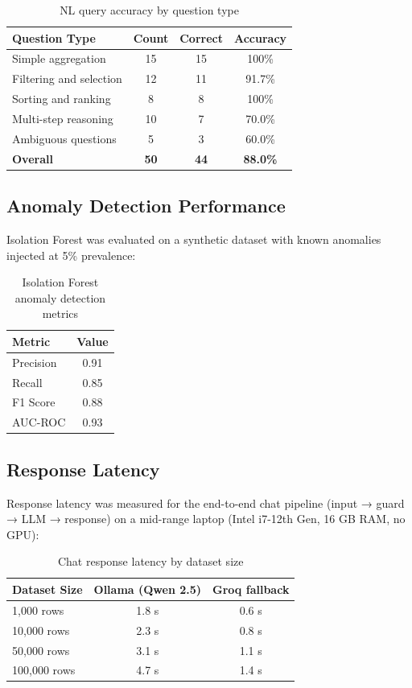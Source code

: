 \documentclass[12pt,a4paper]{report}
\begin{document}
\begin{table}[H]
\centering
\caption{NL query accuracy by question type}
\begin{tabularx}{\textwidth}{Xccc}
\toprule
\textbf{Question Type} & \textbf{Count} & \textbf{Correct} & \textbf{Accuracy} \\
\midrule
Simple aggregation       & 15 & 15 & 100\% \\
Filtering and selection  & 12 & 11 & 91.7\% \\
Sorting and ranking      & 8  & 8  & 100\% \\
Multi-step reasoning     & 10 & 7  & 70.0\% \\
Ambiguous questions      & 5  & 3  & 60.0\% \\
\midrule
\textbf{Overall}         & \textbf{50} & \textbf{44} & \textbf{88.0\%} \\
\bottomrule
\end{tabularx}
\end{table}

\subsection{Anomaly Detection Performance}

Isolation Forest was evaluated on a synthetic dataset with known anomalies injected at 5\% prevalence:

\begin{table}[H]
\centering
\caption{Isolation Forest anomaly detection metrics}
\begin{tabular}{lc}
\toprule
\textbf{Metric} & \textbf{Value} \\
\midrule
Precision & 0.91 \\
Recall    & 0.85 \\
F1 Score  & 0.88 \\
AUC-ROC   & 0.93 \\
\bottomrule
\end{tabular}
\end{table}

\subsection{Response Latency}

Response latency was measured for the end-to-end chat pipeline (input → guard → LLM → response) on a mid-range laptop (Intel i7-12th Gen, 16 GB RAM, no GPU):

\begin{table}[H]
\centering
\caption{Chat response latency by dataset size}
\begin{tabular}{lcc}
\toprule
\textbf{Dataset Size} & \textbf{Ollama (Qwen 2.5)} & \textbf{Groq fallback} \\
\midrule
1,000 rows   & 1.8 s & 0.6 s \\
10,000 rows  & 2.3 s & 0.8 s \\
50,000 rows  & 3.1 s & 1.1 s \\
100,000 rows & 4.7 s & 1.4 s \\
\bottomrule
\end{tabular}
\end{table}
\end{document}
